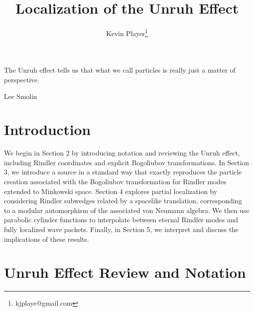 \documentclass[12pt,a4paper]{article}
\begin{document}
\title{Localization of the Unruh Effect}
\author[1]{Kevin Player\footnote{kjplaye@gmail.com}}

\maketitle

\epigraph{The Unruh effect tells us that what we call particles is really just a matter of perspective.}{Lee Smolin}


\section{Introduction}

We begin in Section 2 by introducing notation and reviewing the Unruh effect, including Rindler coordinates and explicit Bogoliubov transformations. In Section 3, we introduce a source in a standard way that exactly reproduces the particle creation associated with the Bogoliubov transformation for Rindler modes extended to Minkowski space. Section 4 explores partial localization by considering Rindler subwedges related by a spacelike translation, corresponding to a modular automorphism of the associated von Neumann algebra. We then use parabolic cylinder functions to interpolate between eternal Rindler modes and fully localized wave packets. Finally, in Section 5, we interpret and discuss the implications of these results.

\section{Unruh Effect Review and Notation}
\end{document}
